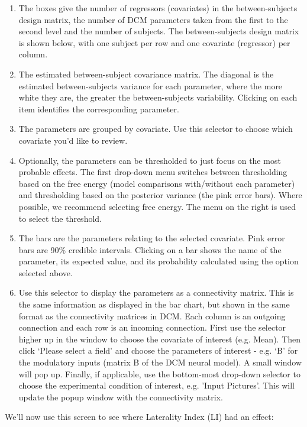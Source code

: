 \documentclass{article}
\begin{document}
\begin{enumerate}[label=\Alph*)]
\item The boxes give the number of regressors (covariates) in the between-subjects design matrix, the number of DCM parameters taken from the first to the second level and the number of subjects. The between-subjects design matrix is shown below, with one subject per row and one covariate (regressor) per column.
\item The estimated between-subject covariance matrix. The diagonal is the estimated between-subjects variance for each parameter, where the more white they are, the greater the between-subjects variability. Clicking on each item identifies the corresponding parameter.
\item The parameters are grouped by covariate. Use this selector to choose which covariate you'd like to review.
\item Optionally, the parameters can be thresholded to just focus on the most probable effects. The first drop-down menu switches between thresholding based on the free energy (model comparisons with/without each parameter) and thresholding based on the posterior variance (the pink error bars). Where possible, we recommend selecting free energy. The menu on the right is used to select the threshold.
\item The bars are the parameters relating to the selected covariate. Pink error bars are 90\% credible intervals. Clicking on a bar shows the name of the parameter, its expected value, and its probability calculated using the option selected above.
\item Use this selector to display the parameters as a connectivity matrix. This is the same information as displayed in the bar chart, but shown in the same format as the connectivity matrices in DCM. Each column is an outgoing connection and each row is an incoming connection. First use the selector higher up in the window to choose the covariate of interest (e.g. Mean). Then click `Please select a field' and choose the parameters of interest - e.g. `B' for the modulatory inputs (matrix B of the DCM neural model). A small window will pop up. Finally, if applicable, use the bottom-most drop-down selector to choose the experimental condition of interest, e.g. 'Input Pictures'. This will update the popup window with the connectivity matrix.
\end{enumerate}

We'll now use this screen to see where Laterality Index (LI) had an effect:
\end{document}
